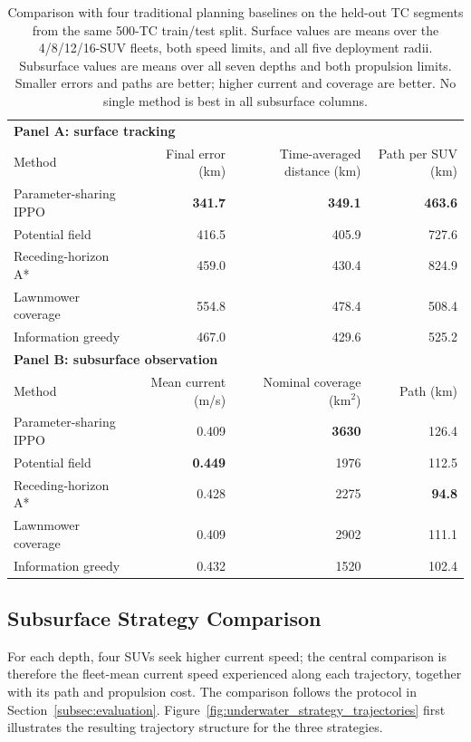 \documentclass[a4paper,fleqn]{cas-dc}
\begin{document}
\begin{table}[t]
\centering
\caption{Comparison with four traditional planning baselines on the held-out
TC segments from the same 500-TC train/test split. Surface values are means
over the 4/8/12/16-SUV fleets, both speed limits, and all five deployment
radii. Subsurface values are means over all seven depths and both propulsion
limits. Smaller errors and paths are better; higher current and coverage are
better. No single method is best in all subsurface columns.}
\label{tab:classical_planners}
\small
\begin{tabular*}{\textwidth}{@{\extracolsep{\fill}}lrrr@{}}
\toprule
\multicolumn{4}{l}{\textbf{Panel A: surface tracking}}\\
Method & Final error (km) & Time-averaged distance (km) & Path per SUV (km)\\
\midrule
Parameter-sharing IPPO & \textbf{341.7} & \textbf{349.1} & \textbf{463.6} \\
Potential field & 416.5 & 405.9 & 727.6 \\
Receding-horizon A* & 459.0 & 430.4 & 824.9 \\
Lawnmower coverage & 554.8 & 478.4 & 508.4 \\
Information greedy & 467.0 & 429.6 & 525.2 \\
\midrule
\multicolumn{4}{l}{\textbf{Panel B: subsurface observation}}\\
Method & Mean current (m/s) & Nominal coverage (km$^2$) & Path (km)\\
\midrule
Parameter-sharing IPPO & 0.409 & \textbf{3630} & 126.4 \\
Potential field & \textbf{0.449} & 1976 & 112.5 \\
Receding-horizon A* & 0.428 & 2275 & \textbf{94.8} \\
Lawnmower coverage & 0.409 & 2902 & 111.1 \\
Information greedy & 0.432 & 1520 & 102.4 \\
\bottomrule
\end{tabular*}
\end{table}

\subsection{Subsurface Strategy Comparison}

For each depth, four SUVs seek higher current speed; the central comparison is
therefore the fleet-mean current speed experienced along each trajectory,
together with its path and propulsion cost.
The comparison follows the protocol in
Section~\ref{subsec:evaluation}. Figure~\ref{fig:underwater_strategy_trajectories}
first illustrates the resulting trajectory structure for the three strategies.
\end{document}
